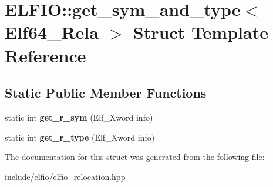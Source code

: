 \hypertarget{struct_e_l_f_i_o_1_1get__sym__and__type_3_01_elf64___rela_01_4}{}\section{E\+L\+F\+IO\+:\+:get\+\_\+sym\+\_\+and\+\_\+type$<$ Elf64\+\_\+\+Rela $>$ Struct Template Reference}
\label{struct_e_l_f_i_o_1_1get__sym__and__type_3_01_elf64___rela_01_4}
\subsection*{Static Public Member Functions}
\begin{DoxyCompactItemize}
\item 
static int {\bfseries get\+\_\+r\+\_\+sym} (Elf\+\_\+\+Xword info)\hypertarget{struct_e_l_f_i_o_1_1get__sym__and__type_3_01_elf64___rela_01_4_ad59695c96c2c59ecd35ced48c7d0fb84}{}\label{struct_e_l_f_i_o_1_1get__sym__and__type_3_01_elf64___rela_01_4_ad59695c96c2c59ecd35ced48c7d0fb84}

\item 
static int {\bfseries get\+\_\+r\+\_\+type} (Elf\+\_\+\+Xword info)\hypertarget{struct_e_l_f_i_o_1_1get__sym__and__type_3_01_elf64___rela_01_4_aec330b10517b454995f8b69104078c11}{}\label{struct_e_l_f_i_o_1_1get__sym__and__type_3_01_elf64___rela_01_4_aec330b10517b454995f8b69104078c11}

\end{DoxyCompactItemize}


The documentation for this struct was generated from the following file\+:\begin{DoxyCompactItemize}
\item 
include/elfio/elfio\+\_\+relocation.\+hpp\end{DoxyCompactItemize}
